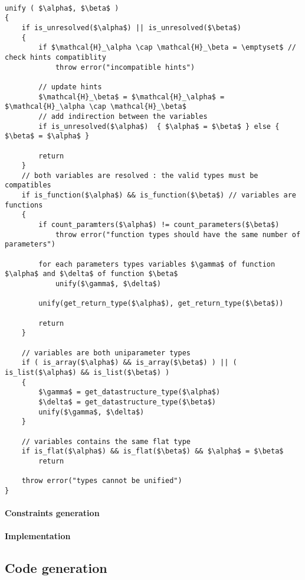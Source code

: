 \documentclass[a4paper,11pt]{article}
\begin{document}
\begin{center}
\begin{minipage}{0.75\linewidth}
\begin{lstlisting}[mathescape,caption={Unification algorithm},label={lst:unification}]

unify ( $\alpha$, $\beta$ )
{
	if is_unresolved($\alpha$) || is_unresolved($\beta$) 
	{
		if $\mathcal{H}_\alpha \cap \mathcal{H}_\beta = \emptyset$ // check hints compatiblity
			throw error("incompatible hints")
	 	
	 	// update hints 
	 	$\mathcal{H}_\beta$ = $\mathcal{H}_\alpha$ = $\mathcal{H}_\alpha \cap \mathcal{H}_\beta$
		// add indirection between the variables
		if is_unresolved($\alpha$)	{ $\alpha$ = $\beta$ } else { $\beta$ = $\alpha$ }
		
		return  
	}	
	// both variables are resolved : the valid types must be compatibles 
	if is_function($\alpha$) && is_function($\beta$) // variables are functions
	{
		if count_paramters($\alpha$) != count_parameters($\beta$) 
			throw error("function types should have the same number of parameters")
		
		for each parameters types variables $\gamma$ of function $\alpha$ and $\delta$ of function $\beta$
			unify($\gamma$, $\delta$)
		
		unify(get_return_type($\alpha$), get_return_type($\beta$))
		
		return
	}

	// variables are both uniparameter types
	if ( is_array($\alpha$) && is_array($\beta$) ) || ( is_list($\alpha$) && is_list($\beta$) ) 
	{
		$\gamma$ = get_datastructure_type($\alpha$)
		$\delta$ = get_datastructure_type($\beta$)
		unify($\gamma$, $\delta$)
	}
	
	// variables contains the same flat type
	if is_flat($\alpha$) && is_flat($\beta$) && $\alpha$ = $\beta$
		return
		
	throw error("types cannot be unified")
}
\end{lstlisting}
\end{minipage}
\end{center}
\paragraph{Constraints generation} 
\paragraph{Implementation}
\subsection{Code generation}
\end{document}

